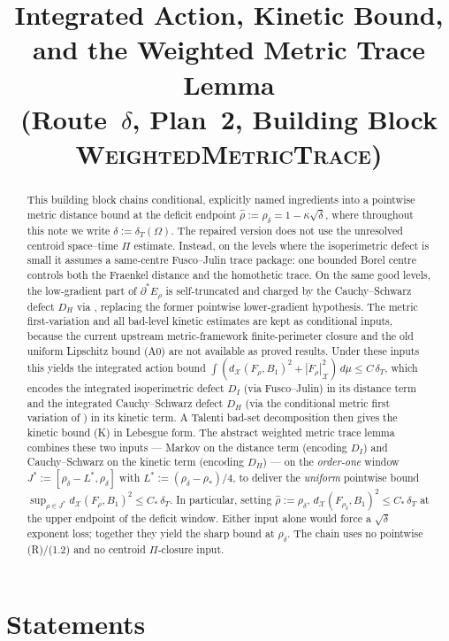 \documentclass[11pt]{article}
\title{Integrated Action, Kinetic Bound,\\
       and the Weighted Metric Trace Lemma\\
       (Route~$\delta$, Plan~2, Building Block \textsc{WeightedMetricTrace})}
\author{}
\date{}
\theoremstyle{definition}
\newcommand{\Om}{\Omega}
\newcommand{\rstar}{\rho_{*}}
\newcommand{\rhad}{\widehat\rho}
\newcommand{\X}{\mathcal X}
\begin{document}
\maketitle

\begin{abstract}
This building block chains conditional, explicitly named ingredients into a pointwise metric
distance bound at the deficit endpoint $\rhad:=\rho_\delta=1-\kappa\sqrt{\delta}$,
where throughout this note we write $\delta:=\delta_T(\Om)$.
The repaired version does not use the unresolved centroid
space--time $\Pi$ estimate.  Instead, on the levels where the
isoperimetric defect is small it assumes a same-centre Fusco--Julin
trace package: one bounded Borel centre controls both the Fraenkel
distance and the homothetic trace.  On the same good levels, the low-gradient part of
$\partial^*E_\rho$ is self-truncated and charged by the
Cauchy--Schwarz defect $D_H$ via \cite{TrimmedVelocityRepair}, replacing
the former pointwise lower-gradient hypothesis.  The metric
first-variation and all bad-level kinetic estimates are kept as
conditional inputs, because the current upstream metric-framework
finite-perimeter closure and the old uniform Lipschitz bound (A0) are
not available as proved results.  Under these inputs this yields the integrated action bound
$\int(d_\X(F_\rho,B_1)^2+|\dot F_\rho|_\X^2)\,d\mu \le C\,\delta_T$,
which encodes the integrated isoperimetric defect $D_I$ (via
Fusco--Julin) in its distance term and the integrated Cauchy--Schwarz
defect $D_H$ (via the conditional metric first variation of \cite{MetricFramework})
in its kinetic term.  A Talenti bad-set decomposition then gives the
kinetic bound (K) in Lebesgue form.  The abstract weighted metric trace
lemma combines these two inputs --- Markov on the distance term
(encoding $D_I$) and Cauchy--Schwarz on the kinetic term (encoding
$D_H$) --- on the \emph{order-one} window
$J^*:=[\rho_\delta-L^*,\rho_\delta]$ with $L^*:=(\rho_\delta-\rstar)/4$,
to deliver the \emph{uniform} pointwise bound
$\sup_{\rho\in J^*} d_\X(F_\rho,B_1)^2\le C_*\,\delta_T$.
In particular, setting $\rhad:=\rho_\delta$,
$d_\X(F_{\rho_\delta},B_1)^2\le C_*\,\delta_T$ at the upper endpoint of
the deficit window.  Either input alone would force a $\sqrt{\delta}$
exponent loss; together they yield the sharp bound at $\rho_\delta$.
The chain uses no pointwise (R)/(1.2) and no centroid $\Pi$-closure input.
\end{abstract}

\section{Statements}\label{sec:statements}
\end{document}

